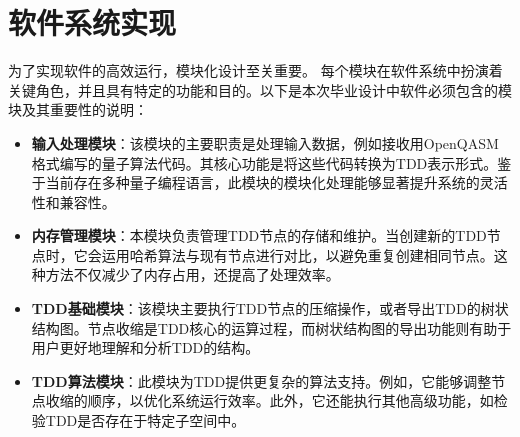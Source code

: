 \section{软件系统实现}
为了实现软件的高效运行，模块化设计至关重要。
每个模块在软件系统中扮演着关键角色，并且具有特定的功能和目的。以下是本次毕业设计中软件必须包含的模块及其重要性的说明：

\begin{itemize}
    \item \textbf{输入处理模块}：该模块的主要职责是处理输入数据，例如接收用OpenQASM格式编写的量子算法代码。其核心功能是将这些代码转换为TDD表示形式。鉴于当前存在多种量子编程语言，此模块的模块化处理能够显著提升系统的灵活性和兼容性。
    \item \textbf{内存管理模块}：本模块负责管理TDD节点的存储和维护。当创建新的TDD节点时，它会运用哈希算法与现有节点进行对比，以避免重复创建相同节点。这种方法不仅减少了内存占用，还提高了处理效率。
    \item \textbf{TDD基础模块}：该模块主要执行TDD节点的压缩操作，或者导出TDD的树状结构图。节点收缩是TDD核心的运算过程，而树状结构图的导出功能则有助于用户更好地理解和分析TDD的结构。
    \item \textbf{TDD算法模块}：此模块为TDD提供更复杂的算法支持。例如，它能够调整节点收缩的顺序，以优化系统运行效率。此外，它还能执行其他高级功能，如检验TDD是否存在于特定子空间中。
\end{itemize}
